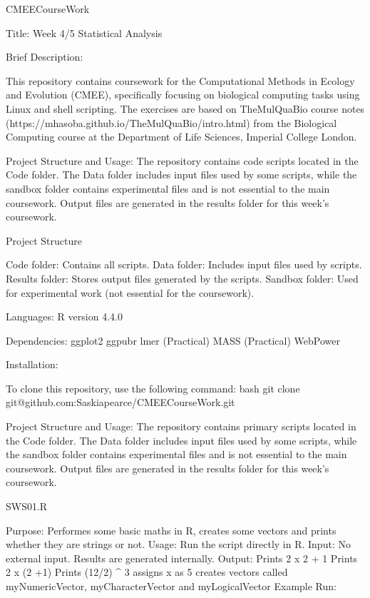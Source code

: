 CMEECourseWork

Title: Week 4/5 Statistical Analysis

Brief Description:

This repository contains coursework for the Computational Methods in Ecology and Evolution (CMEE), specifically focusing on biological computing tasks using Linux and shell scripting. The exercises are based on TheMulQuaBio course notes (https://mhasoba.github.io/TheMulQuaBio/intro.html) from the Biological Computing course at the Department of Life Sciences, Imperial College London.

Project Structure and Usage: The repository contains code scripts located in the Code folder. The Data folder includes input files used by some scripts, while the sandbox folder contains experimental files and is not essential to the main coursework. Output files are generated in the results folder for this week’s coursework.

Project Structure

    Code folder: Contains all scripts.
    Data folder: Includes input files used by scripts.
    Results folder: Stores output files generated by the scripts.
    Sandbox folder: Used for experimental work (not essential for the coursework).

Languages: 
R version 4.4.0 

Dependencies: 
ggplot2
ggpubr
lmer (Practical)
MASS (Practical) 
WebPower

Installation:

To clone this repository, use the following command:
bash
git clone git@github.com:Saskiapearce/CMEECourseWork.git

Project Structure and Usage:
The repository contains primary scripts located in the Code folder. The Data folder includes input files used by some scripts, while the sandbox folder contains experimental files and is not essential to the main coursework. Output files are generated in the results folder for this week’s coursework.

SWS01.R

    Purpose: Performes some basic maths in R, creates some vectors and prints whether they are strings or not.
    Usage: Run the script directly in R.
    Input: No external input. Results are generated internally.
    Output:
        Prints 2 x 2 + 1
        Prints 2 x (2 +1) 
        Prints (12/2) ^ 3
        assigns x as 5 
        creates vectors called myNumericVector, myCharacterVector and myLogicalVector
    Example Run:

